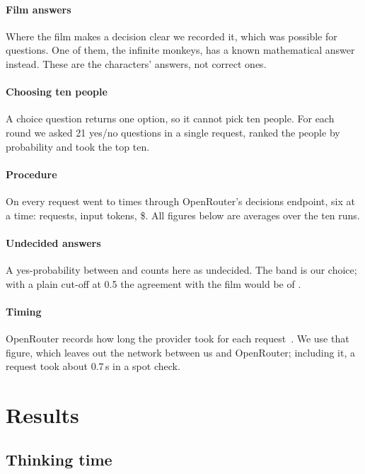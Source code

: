 \documentclass[journal]{IEEEtran}
\begin{document}
\paragraph{Film answers} Where the film makes a decision clear we recorded it, which was possible
for \NFilmQuestions{} questions. One of them, the infinite monkeys, has a known mathematical
answer instead. These are the characters' answers, not correct ones.

\paragraph{Choosing ten people} A choice question returns one option, so it cannot pick ten
people. For each round we asked 21 yes/no questions in a single request, ranked the people by
probability and took the top ten.

\paragraph{Procedure} On \RunDate{} every request went to \texttt{\ModelVersion} \NRuns{} times
through OpenRouter's decisions endpoint, six at a time: \NRequests{} requests, \InputTokens{}
input tokens, \$\TotalCost. All figures below are averages over the ten runs.

\paragraph{Undecided answers} A yes-probability between \BandLo{} and \BandHi{} counts here as
undecided. The band is our choice; with a plain cut-off at 0.5 the agreement with the film would
be \NAgreeHalf{} of \NFilmQuestions.

\paragraph{Timing} OpenRouter records how long the provider took for each
request~\cite{openrouter_generation}. We use that figure, which leaves out the network between us
and OpenRouter; including it, a request took about 0.7\,s in a spot check.


\section{Results}

\subsection{Thinking time}\label{sec:timing}
\end{document}
